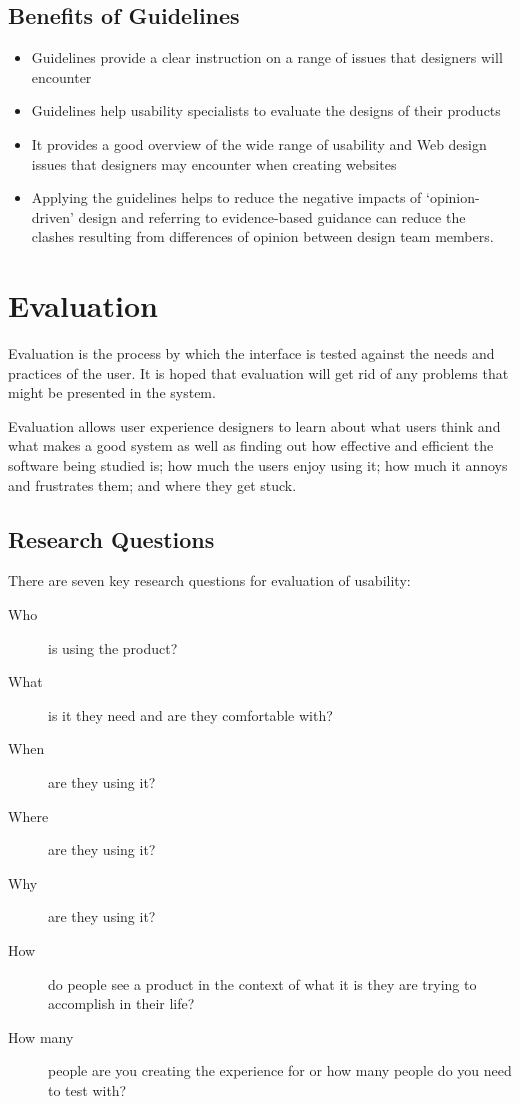 \subsection*{Benefits of Guidelines}
\begin{itemize}
    \item Guidelines provide a clear instruction on a range of issues that designers will encounter
    \item Guidelines help usability specialists to evaluate the designs of their products
    \item It provides a good overview of the wide range of usability and Web design issues that designers may encounter when creating websites
    \item Applying the guidelines helps to reduce the negative impacts of `opinion-driven' design and referring to evidence-based guidance can reduce the clashes resulting from differences of opinion between design team members. 
\end{itemize}

\section*{Evaluation}
Evaluation is the process by which the interface is tested against the needs and practices of the user. It is hoped that evaluation will get rid of any problems that might be presented in the system.

Evaluation allows user experience designers to learn about what users think and what makes a good system as well as finding out how effective and efficient the software being studied is; how much the users enjoy using it; how much it annoys and frustrates them; and where they get stuck. 

\subsection*{Research Questions}
There are seven key research questions for evaluation of usability:
\begin{description}
    \item[Who] is using the product?
    \item[What] is it they need and are they comfortable with?
    \item[When] are they using it?
    \item[Where] are they using it?
    \item[Why] are they using it?
    \item[How] do people see a product in the context of what it is they are trying to accomplish in their life?
    \item[How many] people are you creating the experience for or how many people do you need to test with?
\end{description} 

